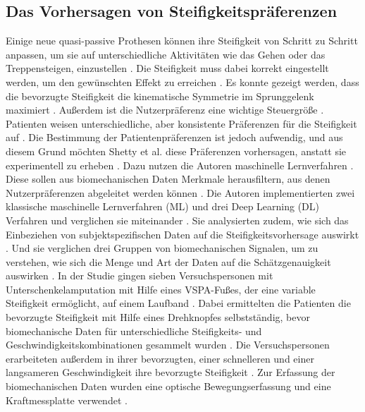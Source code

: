 \subsection{Das Vorhersagen von Steifigkeitspräferenzen}
Einige neue quasi-passive Prothesen können ihre Steifigkeit von Schritt zu Schritt anpassen, um sie auf unterschiedliche Aktivitäten wie das Gehen oder das Treppensteigen, einzustellen \cite{Shetty.2022}. Die Steifigkeit muss dabei korrekt eingestellt werden, um den gewünschten Effekt zu erreichen \cite{Shetty.2022}. Es konnte gezeigt werden, dass die bevorzugte Steifigkeit die kinematische Symmetrie im Sprunggelenk maximiert \cite{Shetty.2022}. Außerdem ist die Nutzerpräferenz eine wichtige Steuergröße \cite{Shetty.2022}. Patienten weisen unterschiedliche, aber konsistente Präferenzen für die Steifigkeit auf \cite{Shetty.2022}. Die Bestimmung der Patientenpräferenzen ist jedoch aufwendig, und aus diesem Grund möchten Shetty et al. diese Präferenzen vorhersagen, anstatt sie experimentell zu erheben \cite{Shetty.2022}. Dazu nutzen die Autoren maschinelle Lernverfahren \cite{Shetty.2022}. Diese sollen aus biomechanischen Daten Merkmale herausfiltern, aus denen Nutzerpräferenzen abgeleitet werden können \cite{Shetty.2022}.
Die Autoren implementierten zwei klassische maschinelle Lernverfahren (ML) und drei Deep Learning (DL) Verfahren und verglichen sie miteinander \cite{Shetty.2022}.
Sie analysierten zudem, wie sich das Einbeziehen von subjektspezifischen Daten auf die Steifigkeitsvorhersage auswirkt \cite{Shetty.2022}. Und sie verglichen drei Gruppen von biomechanischen Signalen, um zu verstehen, wie sich die Menge und Art der Daten auf die Schätzgenauigkeit auswirken \cite{Shetty.2022}.
In der Studie gingen sieben Versuchspersonen mit Unterschenkelamputation mit Hilfe eines VSPA-Fußes, der eine variable Steifigkeit ermöglicht, auf einem Laufband \cite{Shetty.2022}. Dabei ermittelten die Patienten die bevorzugte Steifigkeit mit Hilfe eines Drehknopfes selbstständig, bevor biomechanische Daten für unterschiedliche Steifigkeits- und Geschwindigkeitskombinationen gesammelt wurden \cite{Shetty.2022}. Die Versuchspersonen erarbeiteten außerdem in ihrer bevorzugten, einer schnelleren und einer langsameren Geschwindigkeit ihre bevorzugte Steifigkeit \cite{Shetty.2022}. Zur Erfassung der biomechanischen Daten wurden eine optische Bewegungserfassung und eine Kraftmessplatte verwendet \cite{Shetty.2022}.

